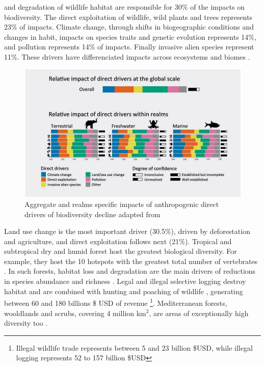 %
and degradation of wildlife habitat are responsible for 30\% of the impacts on biodiversity. The direct exploitation of wildlife, wild plants and trees represents 23\% of impacts. Climate change, through shifts in biogeographic conditions and changes in habit, impacts on species traits and genetic evolution represents 14\%, and pollution represents 14\% of impacts. Finally invasive alien species represent 11\%. These drivers have differenciated impacts across ecosystems and biomes \citep{ipbes_2022_6417333}. 

\begin{figure}[h]
	\centering
	\includegraphics[width = .95 \textwidth]{figures/intro/intro_impactsfin.jpg}
	\caption{Aggregate and realms specific impacts of anthropogenic direct drivers of biodiversity decline adapted from \citep{ipbes_2022_6417333}}
\end{figure}


Land use change is the most important driver (30.5\%), driven by deforestation and agriculture, and direct exploitation follows next (21\%). Tropical and subtropical dry and humid forest host the greatest biological diversity. For example, they host the 10 hotspots with the greatest total number of vertebrates \citep{mittermeier_global_2011}. In such forests, habitat loss and degradation are the main drivers of reductions in species abundance and richness \citep{newbold_global_2014}. Legal and illegal selective logging destroy habitat \citep{hoare2022establishing,  bousfield_2023_large} and are combined with hunting and poaching of wildlife \citep{gallego_2020_combined}, generating between 60 and 180 billions  \$ USD of revenue \citep{gfi_2017}\footnote{Illegal wildlife trade represents between 5 and 23 billion \$USD, while illegal logging represents 52 to 157 billion \$USD}. Mediterranean forests, wooldlands and scrubs, covering 4 million km$^2$, are areas of exceptionally high diversity too \citep{Mooney2001, blondel_2010}. 

